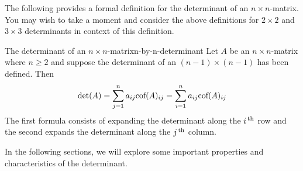 The following provides a formal definition for the determinant of an
$n\times n$-matrix. You may wish to take a moment and consider the
above definitions for $2\times 2$ and $3\times 3$ determinants in
context of this definition.

\begin{definition}{The determinant of an $n\times n$-matrix}{n-by-n-determinant}
  Let $A$ be an $n\times n$-matrix where $n\geq 2$ and suppose the
  determinant of an $(n-1)\times (n-1) $ has been defined. Then
  \begin{equation*}
    \det(A) =\sum_{j=1}^{n}a_{ij}\mbox{\rm cof}(A)
    _{ij}=\sum_{i=1}^{n}a_{ij}\mbox{\rm cof}(A) _{ij}
  \end{equation*}
  The first formula consists of expanding the determinant along the
  $i^{\,\rm th}$ row and the second expands the determinant along the
  $j^{\,\rm th}$ column.
\end{definition}

In the following sections, we will explore some important properties
and characteristics of the determinant.
